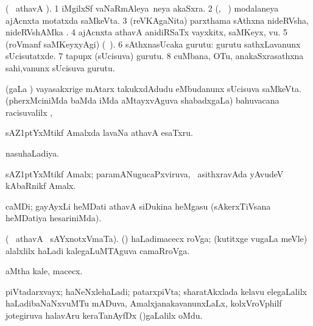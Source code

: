 \bentry 
{}  
\gl{\nA} 
\bmng
(\bava\  athavA ). 
\bnum
\num{1} iMgilxSf vaNaRmAleya \,neya akaSxra. 
\num{2} (\biVga, \sA\ ) modalaneya ajAcnxta motatxda saMkeVta. 
\num{3} (reVKAgaNita) parxthama sAthxna nideRVsha, nideRVshAMka .  
\num{4} ajAcnxta athavA anidiRSaTx vayxkitx, saMKeyx, \mo vu. 
\num{5} (roVmanf saMKeyxyAgi)  (\udA\ ).   
\num{6} sAthxnasUcaka gurutu:   \; gurutu sathxLavanunx sUcisutatxde. 
\num{7} tapupx (sUcisuva) gurutu. 
\num{8} cuMbana, OTu, anakaSxrasathxna sahi,\mo vanunx sUcisuva gurutu.
\enum
\emng
\eentry

\bentry
{} 
\gl{\saMkeV} 
\bmng
(\caci gaLa \vi) vayasakxrige mAtarx takukxdAdudu eMbudanunx  sUcisuva saMkeVta.
\emng
\eentry
\bentry
{} 
\gl{\uparx} 
\bmng
(pherxMciniMda baMda  iMda  aMtayxvAguva shabadxgaLa) bahuvacana racisuvalilx \parx, \udA\  
\emng 
\eentry

\bentry
{} 
\gl{\nA} 
\bmng
sAZ\kern1ptYxMtikf Amalxda lavaNa athavA esaTxru.
\emng
\eentry

\bentry
{} 
\gl{\gu} 
\bmng
nasuhaLadiya.
\emng  
\eentry

\bentry
{} 
\gl{\nA} 
\bmng
sAZ\kern1ptYxMtikf Amalx;  paramANugucaPxviruva, \sA\  asithxravAda yAvudeV kAbaRnikf Amalx.
\emng
\eentry

\bentry
{} 
\gl{\nA}
\bmng
caMDi; gayAyxLi heMDati athavA siDukina heMgasu (sAkerxTiVsana heMDatiya hesariniMda).
\emng
\eentry

\bentry
{}
\gl{\nA} 
\bmng
(\bava\  athavA  \ucAcx\ sAYxnotxVmaTa). ({\roVshA})
\banum
{}  haLadimacecx roVga; (kutitxge \mo vugaLa meVle) alalxlilx haLadi kalegaLuMTAguva camaRroVga.
 
 aMtha kale, macecx.
\eanum
\emng
\eentry

\bentry
{} 
\gl{\nA}
\bmng
piVtadarxvayx; haNeNxlehaLadi; patarxpiVta; sharatAkxlada kelavu elegaLalilx  haLadibaNaNxvuMTu mADuva,  AmalxjanakavanunxLaLx, kolxVroVphilf jotegiruva halavAru keraTanAyfDx ()gaLalilx oMdu.
\emng  
\eentry

